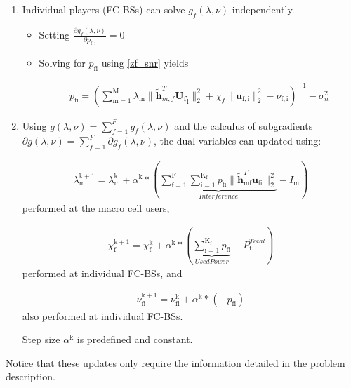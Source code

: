 \documentclass[12pt,a4paper]{report}
\begin{document}
\begin{enumerate}
\item 
Individual players (FC-BSs) can solve $ g_f(\lambda,\nu) $ independently.
\begin{itemize}
\item Setting $\frac{\partial g_f(\lambda,\nu)}{\partial p_{\mathrm{f,i}}} = 0$ 

\item 
Solving for $p_{\mathrm{fi}}$ using \eqref{zf_snr} yields

\begin{gather}
p_{\mathrm{fi}} = (\sum_{\mathrm{m=1}}^{\mathrm{M}}\lambda_{\mathrm{m}}\|\mathbf{\tilde{h}}_{m,f}^T \mathbf{U_f}_{\mathrm{i}}\|^2_2
+\chi_{f} \|\mathbf{u}_{\mathrm{f,i}}\|^2_2
-\nu_{\mathrm{f,i}}
 )^{-1}
  - \sigma^2_n
\end{gather}

\end{itemize}
\item 
Using $g(\lambda,\nu) = \sum_{f=1}^{F}g_f(\lambda,\nu)$ and the calculus of subgradients $\partial g(\lambda,\nu) = \sum_{f=1}^{F} \partial g_f(\lambda,\nu)$, the dual variables can updated using:

\begin{gather}
\lambda_{\mathrm{m}}^{\mathrm{k+1}} = 
\lambda_{\mathrm{m}}^{\mathrm{k}}
+
\alpha^{\mathrm{k}}*
(
\underbrace{
\sum _{\mathrm{f=1}}^{\mathrm{F}}
\sum _{\mathrm{i=1}}^{\mathrm{K_{\mathrm{f}}}}
p_{\mathrm{fi}}
\|\mathbf{\tilde{h}}_{\mathrm{mf}}^T \mathbf{u_{\mathrm{fi}}}\|^2_2}_{Interference}
- I_{\mathrm{m}}
)
\end{gather}
performed at the macro cell users,

\begin{gather}
\chi_{\mathrm{f}}^{\mathrm{k+1}} = 
\chi_{\mathrm{f}}^{\mathrm{k}}
+
\alpha^{\mathrm{k}}*
(\underbrace{\sum_{\mathrm{i=1}}^{\mathrm{K_{\mathrm{f}}}} p_{\mathrm{fi}}}_{Used Power} - P_{\mathrm{f}}^{Total}) 
\end{gather}
performed at individual FC-BSs, and 

\begin{gather}
\nu_{\mathrm{fi}}^{\mathrm{k+1}} = 
\nu_{\mathrm{fi}}^{\mathrm{k}}
+
\alpha^{\mathrm{k}}*
(-p_{\mathrm{fi}})
\end{gather}
also performed at individual FC-BSs.


Step size $\alpha^{\mathrm{k}}$ is predefined and constant.



\end{enumerate} 
Notice that these updates only require the information detailed in the problem description. 
\end{document}
